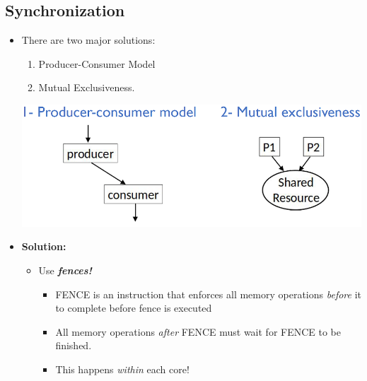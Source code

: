 \documentclass[10pt]{article}
\begin{document}
\subsection*{Synchronization}
\begin{itemize}
    \item There are two major solutions:
    \begin{enumerate}
        \item Producer-Consumer Model
        \item Mutual Exclusiveness.
    \end{enumerate}
    \begin{center}
        \includegraphics*[scale=0.6]{W9_5.png}
    \end{center}
    \item \textbf{Solution:}
    \begin{itemize}
        \item Use \textit{\textbf{fences!}}
        \begin{itemize}
            \item FENCE is an instruction that enforces all memory operations \textit{before} it to complete before fence is executed
            \item All memory operations \textit{after} FENCE must wait for FENCE to be finished.
            \item This happens \textit{within} each core!
        \end{itemize}
    \end{itemize}
\end{itemize}
\end{document}
